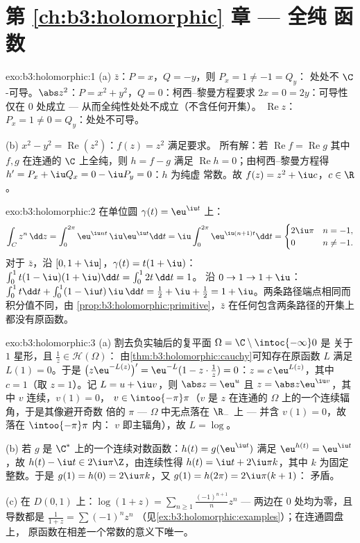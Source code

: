 \section*{第 \ref{ch:b3:holomorphic} 章 --- 全纯
函数}

\begin{solution}{exo:b3:holomorphic:1}
(a) $\bar z$：$P = x$，$Q = -y$，则 $P_x = 1 \neq -1 = Q_y$：
处处不 $\C$-可导。$\abs z^2$：$P = x^2 + y^2$，$Q =
0$：柯西–黎曼方程要求 $2x = 0 = 2y$：可导性仅在
$0$ 处成立 --- 从而全纯性处处不成立（不含任何开集）。
$\operatorname{Re}z$：$P_x = 1 \neq 0 = Q_y$：处处不可导。

(b) $x^2 - y^2 = \operatorname{Re}(z^2)$：$f(z) = z^2$ 满足要求。
所有解：若 $\operatorname{Re}f = \operatorname{Re}g$
其中 $f, g$ 在连通的 $\C$ 上全纯，则 $h = f -
g$ 满足 $\operatorname{Re}h = 0$；由柯西–黎曼方程得 $h' =
P_x + \iu Q_x = 0 - \iu P_y = 0$：$h$ 为纯虚
常数。故 $f(z) = z^2 + \iu c$，$c \in \R$。
\end{solution}

\begin{solution}{exo:b3:holomorphic:2}
在单位圆 $\gamma(t) = \eu^{\iu t}$ 上：
\[
\int_C z^n\,\dd z = \int_0^{2\pi}\eu^{\iu nt}\,\iu\eu^{\iu
t}\dd t = \iu\int_0^{2\pi}\eu^{\iu(n+1)t}\dd t
= \begin{cases} 2\iu\pi & n = -1,\\ 0 & n \neq -1.\end{cases}
\]
对于 $\bar z$，沿 $[0, 1+\iu]$，$\gamma(t) = t(1 + \iu)$：
$\int_0^1 t(1 - \iu)(1 + \iu)\dd t = \int_0^12t\,\dd t = 1$。
沿 $0 \to 1 \to 1 + \iu$：$\int_0^1t\dd t +
\int_0^1(1 - \iu t)\,\iu\,\dd t = \frac12 + \iu + \frac12 = 1
+ \iu$。两条路径端点相同而积分值不同，由
\cref{prop:b3:holomorphic:primitive}，$\bar z$ 在任何包含两条路径的开集上
都没有原函数。
\end{solution}

\begin{solution}{exo:b3:holomorphic:3}
(a) 割去负实轴后的复平面 $\Omega = \C\setminus\intoc{-\infty}0$ 是
关于 $1$ 星形，且 $\frac1z \in \mathcal H(\Omega)$：
由\cref{thm:b3:holomorphic:cauchy}可知存在原函数 $L$
满足 $L(1) = 0$。于是 $\bigl(z\eu^{-L(z)}\bigr)' =
\eu^{-L}(1 - z\cdot\frac1z) = 0$：$z = c\,\eu^{L(z)}$，其中 $c
= 1$（取 $z = 1$）。记 $L = u + \iu v$，则 $\abs z = \eu^u$
且 $z = \abs z\eu^{\iu v}$，其中 $v$ 连续，$v(1) = 0$，
$v \in \intoo{-\pi}\pi$（$v$ 是 $z$
在连通的 $\Omega$ 上的一个连续辐角，于是其像避开奇数
倍的 $\pi$ --- $\Omega$ 中无点落在 $\R_-$ 上 ---
并含 $v(1) = 0$，故落在 $\intoo{-\pi}\pi$ 内：
$v$ 即主辐角），故 $L = \log$。

(b) 若 $g$ 是 $\C^*$ 上的一个连续对数函数：$h(t) =
g(\eu^{\iu t})$ 满足 $\eu^{h(t)} = \eu^{\iu t}$，故 $h(t)
- \iu t \in 2\iu\pi\Z$，由连续性得 $h(t) = \iu t +
2\iu\pi k$，其中 $k$ 为固定整数。于是 $g(1) = h(0) =
2\iu\pi k$，又 $g(1) = h(2\pi) = 2\iu\pi(k + 1)$：
矛盾。

(c) 在 $D(0,1)$ 上：$\log(1 + z) =
\sum_{n\geq1}\frac{(-1)^{n+1}}{n}z^n$ --- 两边在
$0$ 处均为零，且导数都是 $\frac1{1+z} = \sum(-1)^nz^n$
（见\cref{ex:b3:holomorphic:examples}）；在连通圆盘上，
原函数在相差一个常数的意义下唯一。
\end{solution}

